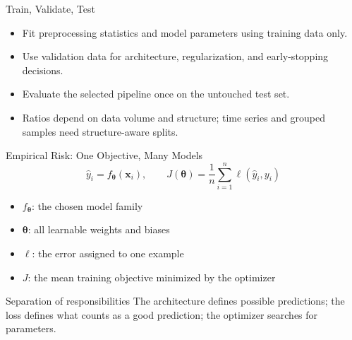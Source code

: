 \documentclass[10pt,aspectratio=169]{ntuabeamer}
\begin{document}
\begin{frame}{Train, Validate, Test}
  \begin{center}
  \end{center}
  \begin{itemize}
    \item Fit preprocessing statistics and model parameters using training data only.
    \item Use validation data for architecture, regularization, and early-stopping decisions.
    \item Evaluate the selected pipeline once on the untouched test set.
    \item Ratios depend on data volume and structure; time series and grouped samples need structure-aware splits.
  \end{itemize}
\end{frame}

\begin{frame}{Empirical Risk: One Objective, Many Models}
  \[
    \hat y_i=f_{\boldsymbol\theta}(\mathbf x_i),
    \qquad
    J(\boldsymbol\theta)=\frac{1}{n}\sum_{i=1}^{n}
    \ell(\hat y_i,y_i)
  \]
  \begin{itemize}
    \item $f_{\boldsymbol\theta}$: the chosen model family
    \item $\boldsymbol\theta$: all learnable weights and biases
    \item $\ell$: the error assigned to one example
    \item $J$: the mean training objective minimized by the optimizer
  \end{itemize}
  \begin{block}{Separation of responsibilities}
    The architecture defines possible predictions; the loss defines what counts as a good prediction; the optimizer searches for parameters.
  \end{block}
\end{frame}
\end{document}
